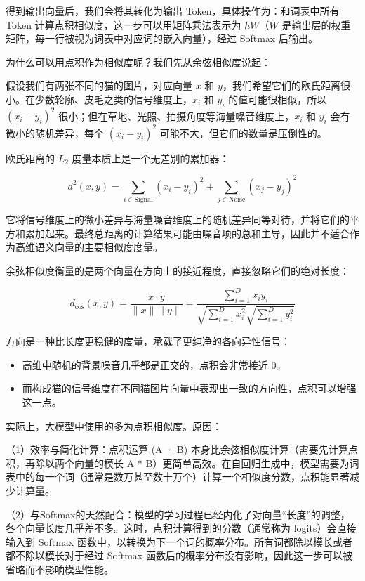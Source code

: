 得到输出向量后，我们会将其转化为输出 Token，具体操作为：和词表中所有 Token 计算点积相似度，这一步可以用矩阵乘法表示为 \(hW\)（\(W\) 是输出层的权重矩阵，每一行被视为词表中对应词的嵌入向量），经过 Softmax 后输出。

为什么可以用点积作为相似度呢？我们先从余弦相似度说起：

假设我们有两张不同的猫的图片，对应向量 \(x\) 和 \(y\)，我们希望它们的欧氏距离很小。在少数轮廓、皮毛之类的信号维度上，\(x_i\) 和 \(y_i\) 的值可能很相似，所以 \((x_i-y_i)^2\) 很小；但在草地、光照、拍摄角度等海量噪音维度上，\(x_i\) 和 \(y_i\) 会有微小的随机差异，每个 \((x_i-y_i)^2\) 可能不大，但它们的数量是压倒性的。

欧氏距离的 \(L_2\) 度量本质上是一个无差别的累加器：

\[
d^2(x,y)=\sum_{i\in\text{Signal}}(x_i-y_i)^2+\sum_{j\in\text{Noise}}(x_j-y_j)^2
\]

它将信号维度上的微小差异与海量噪音维度上的随机差异同等对待，并将它们的平方和累加起来。最终总距离的计算结果可能由噪音项的总和主导，因此并不适合作为高维语义向量的主要相似度度量。

余弦相似度衡量的是两个向量在方向上的接近程度，直接忽略它们的绝对长度：

\[
d_{\cos}(x,y)=\frac{x\cdot y}{\|x\|\|y\|}=\frac{\sum_{i=1}^{D}x_i y_i}{\sqrt{\sum_{i=1}^{D}x_i^2}\sqrt{\sum_{i=1}^{D}y_i^2}}
\]

方向是一种比长度更稳健的度量，承载了更纯净的各向异性信号：

\begin{itemize}
\tightlist
\item
  高维中随机的背景噪音几乎都是正交的，点积会非常接近 0。
\item
  而构成猫的信号维度在不同猫图片向量中表现出一致的方向性，点积可以增强这一点。
\end{itemize}

实际上，大模型中使用的多为点积相似度。原因：

（1）效率与简化计算\hspace{0pt}：点积运算 (A · B) 本身比余弦相似度计算（需要先计算点积，再除以两个向量的模长 \textbar\textbar A\textbar\textbar{} * \textbar\textbar B\textbar\textbar）更简单高效。在自回归生成中，模型需要为词表中的每一个词（通常是数万甚至数十万个）计算一个相似度分数，点积能显著减少计算量。

（2）与Softmax的天然配合：模型的学习过程已经内化了对向量``长度''的调整，各个向量长度几乎差不多。这时，点积计算得到的分数（通常称为 logits）会直接输入到 Softmax 函数中，以转换为下一个词的概率分布。所有词都除以模长或者都不除以模长对于经过 Softmax 函数后的概率分布没有影响，因此这一步可以被省略而不影响模型性能。

